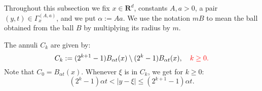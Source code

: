 \documentclass{amsart}
\theoremstyle{remark}
\renewcommand{\leq}{\leqslant}
\renewcommand{\leq}{\leqslant}
\renewcommand{\geq}{\geqslant}
\newcommand{\R}{\mathbf R}
\newcommand{\e}{\mathrm{e}} %
\renewcommand{\leq}{\leqslant}%
\renewcommand{\geq}{\geqslant}%
\newcommand{\red}{\color{red}}
\begin{document}
Throughout this subsection we fix $x\in \R^d$, constants $A,a>0$, a pair $(y,t)\in \Gamma_x^{(A,a)}$,
and we put $\alpha:=Aa$. 
We use
the notation $mB$ to mean the ball obtained from the ball $B$ by
multiplying its radius by $m$.

The annuli $C_k$ are given by:
\begin{equation}
  \label{eq:C_k-annulus-decomposition}
  C_k : = (2^{k + 1} - 1)B_{\alpha t}(x) \setminus (2^k - 1)B_{\alpha t}(x), \quad {\red k\ge 0.}
\end{equation}
{\red Note that $C_0 = B_{\alpha t}(x)$.} Whenever $\xi$ is in $C_k$, we get for $k \geq 0$:
\begin{equation}
  \label{eq:C_k-annulus-decomposition-expand}
  (2^k - 1)\alpha t < |y - \xi| \leq (2^{k + 1} - 1) \alpha t.
\end{equation}
\end{document}
